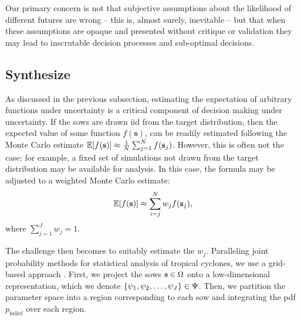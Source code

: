 \documentclass{agujournal2019}
\begin{document}
Our primary concern is not that subjective assumptions about the likelihood of different futures are wrong -- this is, almost surely, inevitable -- but that when these assumptions are opaque and presented without critique or validation they may lead to inscrutable decision processes and sub-optimal decisions.

\subsection{Synthesize}\label{sec:analysis-synthesize}

As discussed in the previous subsection, estimating the expectation of arbitrary functions under uncertainty is a critical component of decision making under uncertainty.
If the \glspl{sow} are drawn \gls{iid} from the target distribution, then the expected value of some function $f(\mathbf{s})$, can be readily estimated following the Monte Carlo estimate $\mathbb{E}\qty[f(\vb{s})] \approx \frac{1}{N} \sum_{j=1}^N f(\vb{s}_j)$.
However, this is often not the case; for example, a fixed set of simulations not drawn from the target distribution may be available for analysis.
In this case, the formula may be adjusted to a weighted Monte Carlo estimate:
\begin{equation}
  \mathbb{E}\qty[f(\vb{s})] \approx \sum_{i=j}^N w_j f(\vb{s}_j),
\end{equation}
where $\sum_{j=1}^J w_j = 1$.

The challenge then becomes to suitably estimate the $w_j$.
Paralleling joint probability methods for statistical analysis of tropical cyclones, we use a grid-based approach \cite{johnson_clara:2013,resio_probabilities:2007,toro_jpm-os:2010}.
First, we project the \glspl{sow} $\vb{s} \in \Omega$ onto a low-dimensional representation, which we denote $\qty{\psi_1, \psi_2, \ldots, \psi_J} \in \Psi$.
Then, we partition the parameter space into a region corresponding to each \gls{sow} and integrating the \gls{pdf} $p_\mathrm{belief}$ over each region.
\end{document}
